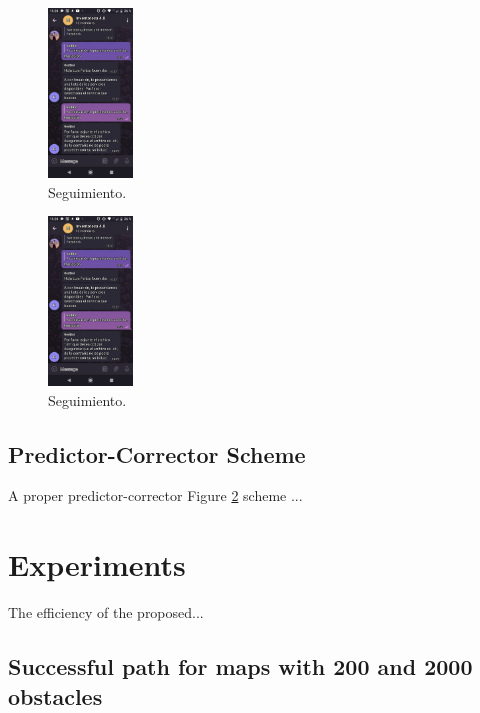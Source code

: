 \documentclass[conference]{IEEEtran}
\begin{document}
  \begin{figure}[H]
\begin{center}
\includegraphics[width=0.2\textwidth]{imagenes/hiper2.eps} 
\caption{ Seguimiento.}
\label{fig:hiper3}
\end{center}
\end{figure}    
  
\begin{figure}[H]
\begin{center}
\includegraphics[width=0.2\textwidth]{imagenes/hiper2.eps} 
\caption{ Seguimiento.}
\label{fig:hiper4}
\end{center}
\end{figure}    
  
\subsection*{Predictor-Corrector Scheme}
 A proper \cite{plc1} predictor-corrector Figure \ref{fig:hiper4} scheme \cite{Hector1, Gerardo1}...
  
 
 



\section{Experiments}

The efficiency of the \cite{Park-2008} proposed...
\subsection{Successful path for maps with 200 and 2000 obstacles}
\end{document}
